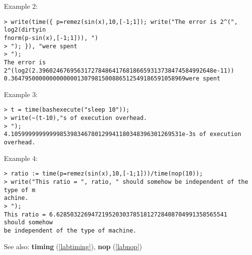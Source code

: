 \noindent Example 2: 
\begin{center}\begin{minipage}{15cm}\begin{Verbatim}[frame=single]
> write(time({ p=remez(sin(x),10,[-1;1]); write("The error is 2^(", log2(dirtyin
fnorm(p-sin(x),[-1;1])), ")
> "); }), "were spent
> ");
The error is 2^(log2(2.39602467695631727848641768186659313738474584992648e-11))
0.36479500000000000001307981500886512549186591058969were spent
\end{Verbatim}
\end{minipage}\end{center}
\noindent Example 3: 
\begin{center}\begin{minipage}{15cm}\begin{Verbatim}[frame=single]
> t = time(bashexecute("sleep 10"));
> write(~(t-10),"s of execution overhead.
> ");
4.1059999999999985398346780129941180348396301269531e-3s of execution overhead.
\end{Verbatim}
\end{minipage}\end{center}
\noindent Example 4: 
\begin{center}\begin{minipage}{15cm}\begin{Verbatim}[frame=single]
> ratio := time(p=remez(sin(x),10,[-1;1]))/time(nop(10));
> write("This ratio = ", ratio, " should somehow be independent of the type of m
achine.
> ");
This ratio = 6.6285032269472195203037851812728408704991358565541 should somehow 
be independent of the type of machine.
\end{Verbatim}
\end{minipage}\end{center}
See also: \textbf{timing} (\ref{labtiming}), \textbf{nop} (\ref{labnop})
